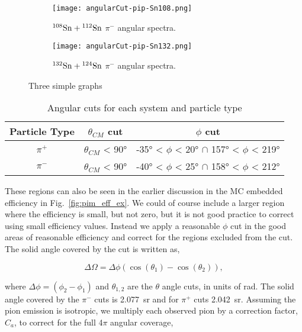 \begin{figure}[!htb]
     \centering
     \begin{subfigure}[b]{0.49\textwidth}
         \centering
         \texttt{[image: angularCut-pip-Sn108.png]}
         \caption{${}^{108}\mathrm{Sn} + {}^{112}\mathrm{Sn}$ $\pi^-$ angular spectra.}
         \label{fig:pip108angle}
     \end{subfigure}
     \hfill
     \begin{subfigure}[b]{0.49\textwidth}
         \centering
         \texttt{[image: angularCut-pip-Sn132.png]}
         \caption{${}^{132}\mathrm{Sn} + {}^{124}\mathrm{Sn}$ $\pi^-$ angular spectra.}
         \label{fig:pip132angle}
     \end{subfigure}
        \caption{Three simple graphs}
        \label{fig:pip}
\end{figure}



 \begin{table*}[!htb]
 \centering
{}
\begin{tabular}{@{}ccc@{}}\toprule 
Particle Type & $\theta_{CM}$ cut & $\phi$ cut  \\ [0.5ex] 
 \midrule
$\pi^+$  & $\theta_{CM}$ < \ang{90}   &  \ang{-35} < $\phi$ < \ang{20} $\cap$ \ang{157} < $\phi$ < \ang{219}  \\
$\pi^-$  & $\theta_{CM}$ < \ang{90}   &  \ang{-40} < $\phi$ < \ang{25} $\cap$ \ang{158} < $\phi$ < \ang{212}   \\
 \bottomrule
\end{tabular}
\caption{Angular cuts for each system and particle type}
\label{tb:anglecuts}
\end{table*}



These regions can also be seen in the earlier discussion in the MC embedded efficiency in Fig.~\ref{fig:pim_eff_ex}.  We could of course include a larger region where the efficiency is small, but not zero, but it is not good practice to  correct using small efficiency values. Instead we apply a reasonable $\phi$ cut in the good areas of reasonable efficiency and correct for the regions excluded from the cut. The solid angle covered by the cut is written as,

\begin{equation}
\Delta\Omega = \Delta\phi(\cos(\theta_1) - \cos(\theta_2)),
\end{equation}

where $\Delta\phi = (\phi_2 - \phi_1)$  and $\theta_{1,2}$ are the $\theta$ angle cuts, in units of \si{\radian}. The solid angle covered by the $\pi^-$ cuts is \SI{2.077}{\steradian} and for $\pi^+$ cuts \SI{2.042}{\steradian}. Assuming the pion emission is isotropic, we multiply each observed pion by a correction factor, $C_a$, to correct for the full 4$\pi$ angular coverage, 

